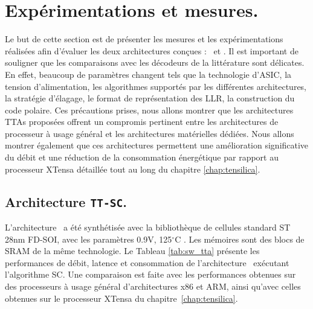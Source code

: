 \section{Expérimentations et mesures.}
Le but de cette section est de présenter les mesures et les expérimentations réalisées afin d'évaluer les deux architectures conçues : \TTSC~et \TTSCAN. Il est important de souligner que les comparaisons avec les décodeurs de la littérature sont délicates. En effet, beaucoup de paramètres changent tels que la technologie d'ASIC, la tension d'alimentation, les algorithmes supportés par les différentes architectures, la stratégie d'élagage, le format de représentation des LLR, la construction du code polaire. Ces précautions prises, nous allons montrer que les architectures TTAs proposées offrent un compromis pertinent entre les architectures de processeur à usage général et les architectures matérielles dédiées. Nous allons montrer également que ces architectures permettent une amélioration significative du débit et une réduction de la consommation énergétique par rapport au processeur XTensa détaillée tout au long du chapitre \ref{chap:tensilica}.

\subsection{Architecture \texttt{TT-SC}.}
\label{sec:tta_res}

L'architecture \TTSC~a été synthétisée avec la bibliothèque de cellules standard ST 28nm FD-SOI, avec les paramètres 0.9V, 125$^{\circ}$C . Les mémoires sont des blocs de SRAM de la même technologie. Le Tableau \ref{tab:sw_tta} présente les performances de débit, latence et consommation de l'architecture \TTSC~exécutant l'algorithme SC. Une comparaison est faite avec les performances obtenues sur des processeurs à usage général d'architectures x86 et ARM, ainsi qu'avec celles obtenues sur le processeur XTensa du chapitre~\ref{chap:tensilica}.


